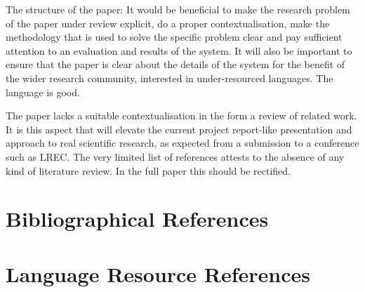 \documentclass[10pt, a4paper]{article}
\begin{document}
The structure of the paper: It would be beneficial to make the research problem
of the paper under review explicit, do a proper contextualisation, make the
methodology that is used to solve the specific problem clear and pay sufficient
attention to an evaluation and results of the system. It will also be important
to ensure that the paper is clear about the details of the system for the
benefit of the wider research community, interested in under-resourced
languages.  The language is good.

The paper lacks a suitable contextualisation in the form a review of related
work. It is this aspect that will elevate the current project report-like
presentation and approach to real scientific research, as expected from a
submission to a conference such as LREC. The very limited list of references
attests to the absence of any kind of literature review. In the full paper this
should be rectified.
 

\section{Bibliographical References}
\label{main:ref}





\section{Language Resource References}
\label{lr:ref}
\end{document}
